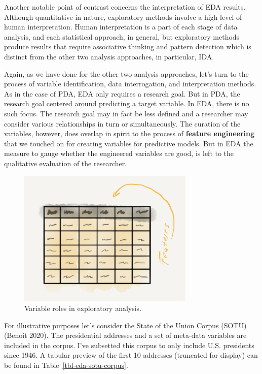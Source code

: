 \documentclass[
  letterpaper,
]{latex/krantz}
\begin{document}
Another notable point of contrast concerns the interpretation of EDA
results. Although quantitative in nature, exploratory methods involve a
high level of human interpretation. Human interpretation is a part of
each stage of data analysis, and each statistical approach, in general,
but exploratory methods produce results that require associative
thinking and pattern detection which is distinct from the other two
analysis approaches, in particular, IDA.

Again, as we have done for the other two analysis approaches, let's turn
to the process of variable identification, data interrogation, and
interpretation methods. As in the case of PDA, EDA only requires a
research goal. But in PDA, the research goal centered around predicting
a target variable. In EDA, there is no such focus. The research goal may
in fact be less defined and a researcher may consider various
relationships in turn or simultaneously. The curation of the variables,
however, does overlap in spirit to the process of \textbf{feature
engineering} that we touched on for creating variables for predictive
models. But in EDA the measure to gauge whether the engineered variables
are good, is left to the qualitative evaluation of the researcher.

\begin{figure}[h]

{\centering \includegraphics[width=0.75\textwidth,height=\textheight]{figures/approaching-analysis/exploratory-variables.png}

}

\caption{\label{fig-aa-exploratory-variables}Variable roles in
exploratory analysis.}

\end{figure}

For illustrative purposes let's consider the State of the Union Corpus
(SOTU) (Benoit 2020). The presidential addresses and a set of meta-data
variables are included in the corpus. I've subsetted this corpus to only
include U.S. presidents since 1946. A tabular preview of the first 10
addresses (truncated for display) can be found in
Table~\ref{tbl-eda-sotu-corpus}.
\end{document}
